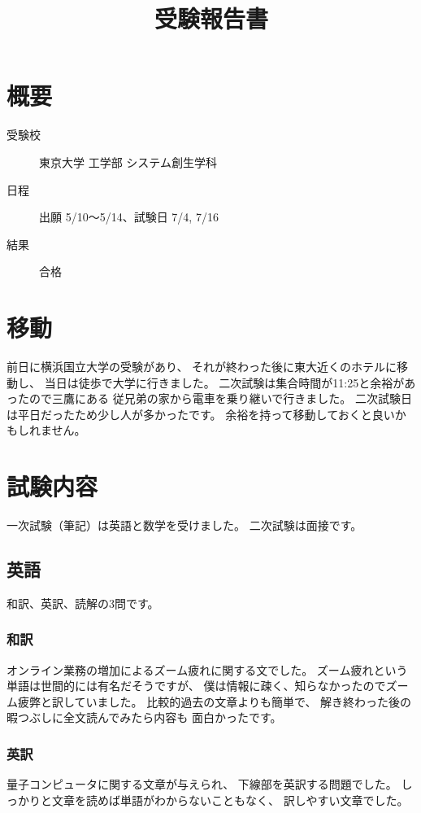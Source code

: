 \documentclass[]{jsarticle}
\title{受験報告書}
\date{}
\begin{document}
\maketitle
\section*{概要}
    \begin{description}
        \item[受験校] 東京大学 工学部 システム創生学科
        \item[日程] 出願 5/10〜5/14、試験日 7/4, 7/16
        \item[結果] 合格
    \end{description}
\section*{移動}
    前日に横浜国立大学の受験があり、
    それが終わった後に東大近くのホテルに移動し、
    当日は徒歩で大学に行きました。
    二次試験は集合時間が11:25と余裕があったので三鷹にある
    従兄弟の家から電車を乗り継いで行きました。
    二次試験日は平日だったため少し人が多かったです。
    余裕を持って移動しておくと良いかもしれません。
\section*{試験内容}
    一次試験（筆記）は英語と数学を受けました。
    二次試験は面接です。
    \subsection*{英語}
        和訳、英訳、読解の3問です。
        \subsubsection*{和訳}
            オンライン業務の増加によるズーム疲れに関する文でした。
            ズーム疲れという単語は世間的には有名だそうですが、
            僕は情報に疎く、知らなかったのでズーム疲弊と訳していました。
            比較的過去の文章よりも簡単で、
            解き終わった後の暇つぶしに全文読んでみたら内容も
            面白かったです。
        \subsubsection*{英訳}
            量子コンピュータに関する文章が与えられ、
            下線部を英訳する問題でした。
            しっかりと文章を読めば単語がわからないこともなく、
            訳しやすい文章でした。
\end{document}
